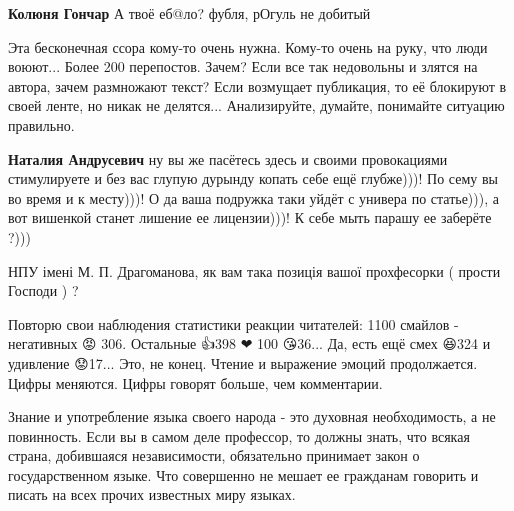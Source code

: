 \begin{itemize}
\begin{itemize}
\textbf{Колюня Гончар} А твоё еб@ло? фубля, рОгуль не добитый🤣
\end{itemize}



Эта бесконечная ссора кому-то очень нужна. Кому-то очень на руку, что люди
воюют... Более 200 перепостов. Зачем? Если все так недовольны и злятся на
автора, зачем размножают текст? Если возмущает публикация, то её блокируют в
своей ленте, но никак не делятся... Анализируйте, думайте, понимайте ситуацию
правильно.

\begin{itemize}

\textbf{Наталия Андрусевич} ну вы же пасётесь здесь и своими провокациями стимулируете и без вас глупую дурынду копать себе ещё глубже)))! По сему вы во время и к месту)))! О да ваша подружка таки уйдёт с универа по статье))), а вот вишенкой станет лишение ее лицензии)))! К себе мыть парашу ее заберёте ?)))
\end{itemize}


НПУ імені М. П. Драгоманова, як вам така позиція вашої прохфесорки ( прости Господи ) ?



Повторю свои наблюдения статистики реакции читателей: 1100 смайлов - негативных
😡 306. Остальные 👍398 ❤ 100 😘36... Да, есть ещё смех 😆324 и удивление
😟17... Это, не конец. Чтение и выражение эмоций продолжается. Цифры меняются.
Цифры говорят больше, чем комментарии.




Знание и употребление языка своего народа - это духовная необходимость, а не
повинность. Если вы в самом деле профессор, то должны знать, что всякая страна,
добившаяся независимости, обязательно принимает закон о государственном языке.
Что совершенно не мешает ее гражданам говорить и писать на всех прочих
известных миру языках.


\end{itemize}
